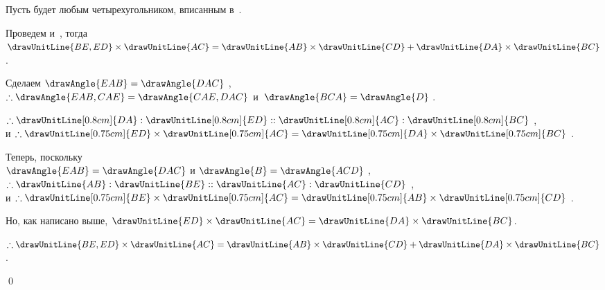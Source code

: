 \documentclass[letters,booklanguage=russian]{byrnebook}
\begin{document}
\begin{center}
Пусть  будет любым четырехугольником, вписанным в~.

Проведем  и~, тогда $\drawUnitLine{BE,ED} \times \drawUnitLine{AC} = \drawUnitLine{AB} \times \drawUnitLine{CD} + \drawUnitLine{DA} \times \drawUnitLine{BC}$.

Сделаем $\drawAngle{EAB} = \drawAngle{DAC}$ ,\\
$\therefore \drawAngle{EAB,CAE} = \drawAngle{CAE,DAC}$ и~$\drawAngle{BCA} = \drawAngle{D}$ .

$\therefore \drawUnitLine[0.8cm]{DA} : \drawUnitLine[0.8cm]{ED} :: \drawUnitLine[0.8cm]{AC} : \drawUnitLine[0.8cm]{BC}$ ,\\
и $\therefore \drawUnitLine[0.75cm]{ED} \times \drawUnitLine[0.75cm]{AC} = \drawUnitLine[0.75cm]{DA} \times \drawUnitLine[0.75cm]{BC}$ .

Теперь, поскольку\\
$\drawAngle{EAB} = \drawAngle{DAC}$ \byref{\constref} и $\drawAngle{B} = \drawAngle{ACD}$ ,\\
$\therefore \drawUnitLine{AB} : \drawUnitLine{BE} :: \drawUnitLine{AC} : \drawUnitLine{CD}$ ,\\
и $\therefore \drawUnitLine[0.75cm]{BE} \times \drawUnitLine[0.75cm]{AC} = \drawUnitLine[0.75cm]{AB} \times \drawUnitLine[0.75cm]{CD}$ .

Но, как написано выше, $\drawUnitLine{ED} \times \drawUnitLine{AC} = \drawUnitLine{DA} \times \drawUnitLine{BC}$.

$\therefore \drawUnitLine{BE,ED} \times \drawUnitLine{AC} = \drawUnitLine{AB} \times \drawUnitLine{CD} + \drawUnitLine{DA} \times \drawUnitLine{BC}$ .
\end{center}

\qed

\tableofcontents
\end{document}
